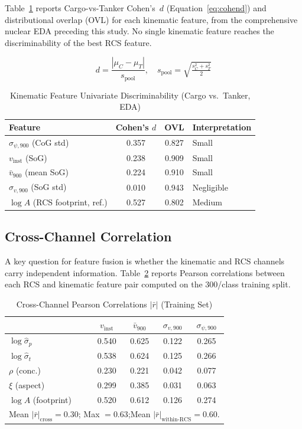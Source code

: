 \documentclass[journal]{IEEEtran}
\begin{document}
Table~\ref{tab:kin_eda} reports Cargo-vs-Tanker Cohen's~$d$
(Equation~\ref{eq:cohend}) and distributional overlap (OVL) for each
kinematic feature, from the comprehensive nuclear EDA preceding this
study. No single kinematic feature reaches the discriminability of the
best RCS feature.

\begin{equation}
  d = \frac{|\mu_C - \mu_T|}{s_{\text{pool}}},\quad
  s_{\text{pool}} = \sqrt{\tfrac{s_C^2+s_T^2}{2}}
  \label{eq:cohend}
\end{equation}

\begin{table}[t]
\centering
\caption{Kinematic Feature Univariate Discriminability (Cargo vs.\ Tanker, EDA)}
\label{tab:kin_eda}
\begin{tabular}{lccl}
\toprule
Feature & Cohen's $d$ & OVL & Interpretation \\
\midrule
$\sigma_{\psi,900}$ (CoG std)  & 0.357 & 0.827 & Small \\
$v_{\text{inst}}$ (SoG)        & 0.238 & 0.909 & Small \\
$\bar{v}_{900}$ (mean SoG)     & 0.224 & 0.910 & Small \\
$\sigma_{v,900}$ (SoG std)     & 0.010 & 0.943 & Negligible \\
\midrule
$\log A$ (RCS footprint, ref.) & 0.527 & 0.802 & Medium \\
\bottomrule
\end{tabular}
\end{table}

\subsection{Cross-Channel Correlation}

A key question for feature fusion is whether the kinematic and RCS
channels carry independent information. Table~\ref{tab:crosscorr}
reports Pearson correlations between each RCS and kinematic feature
pair computed on the 300/class training split.

\begin{table}[t]
\centering
\caption{Cross-Channel Pearson Correlations $|\bar{r}|$ (Training Set)}
\label{tab:crosscorr}
\begin{tabular}{lcccc}
\toprule
 & $v_{\text{inst}}$ & $\bar{v}_{900}$ & $\sigma_{v,900}$ & $\sigma_{\psi,900}$ \\
\midrule
$\log\hat{\sigma}_p$ & 0.540 & 0.625 & 0.122 & 0.265 \\
$\log\hat{\sigma}_t$ & 0.538 & 0.624 & 0.125 & 0.266 \\
$\rho$ (conc.)       & 0.230 & 0.221 & 0.042 & 0.077 \\
$\xi$ (aspect)       & 0.299 & 0.385 & 0.031 & 0.063 \\
$\log A$ (footprint) & 0.520 & 0.612 & 0.126 & 0.274 \\
\bottomrule
\multicolumn{5}{l}{\small Mean $|\bar{r}|_{\text{cross}} = 0.30$;\quad
Max $= 0.63$;\quad Mean $|\bar{r}|_{\text{within-RCS}} = 0.60$.}
\end{tabular}
\end{table}
\end{document}
